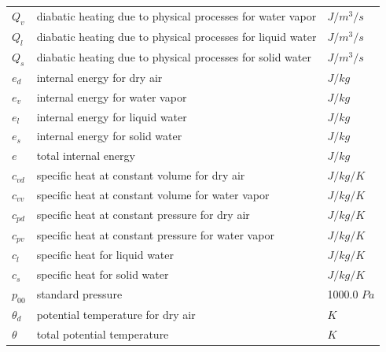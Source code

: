 \documentclass[a4paper]{report}
\begin{document}
\begin{table}[p]
\begin{tabular}{lll}
    $Q_v$   & diabatic heating due to physical processes for water vapor  & $J/m^3/s$ \\
    $Q_l$   & diabatic heating due to physical processes for liquid water  & $J/m^3/s$ \\
    $Q_s$   & diabatic heating due to physical processes for solid water  & $J/m^3/s$ \\
    $e_d$   & internal energy for dry air  & $J/kg$ \\
    $e_v$   & internal energy for water vapor  & $J/kg$ \\
    $e_l$   & internal energy for liquid water & $J/kg$ \\
    $e_s$   & internal energy for solid water & $J/kg$ \\
    $e$   & total internal energy & $J/kg$ \\
    $c_{vd}$   & specific heat at constant volume for dry air & $J/kg/K$ \\
    $c_{vv}$   & specific heat at constant volume for water vapor & $J/kg/K$ \\
    $c_{pd}$   & specific heat at constant pressure for dry air & $J/kg/K$ \\
    $c_{pv}$   & specific heat at constant pressure for water vapor & $J/kg/K$ \\
    $c_l$   & specific heat for liquid water & $J/kg/K$ \\
    $c_s$   & specific heat for solid water & $J/kg/K$ \\
    $p_{00}$   & standard pressure & 1000.0 $Pa$ \\
    $\theta_d $   & potential temperature for dry air&  $K$ \\
    $\theta $   & total potential temperature&  $K$ \\
    \hline
  \end{tabular}
\end{table}
\end{document}
